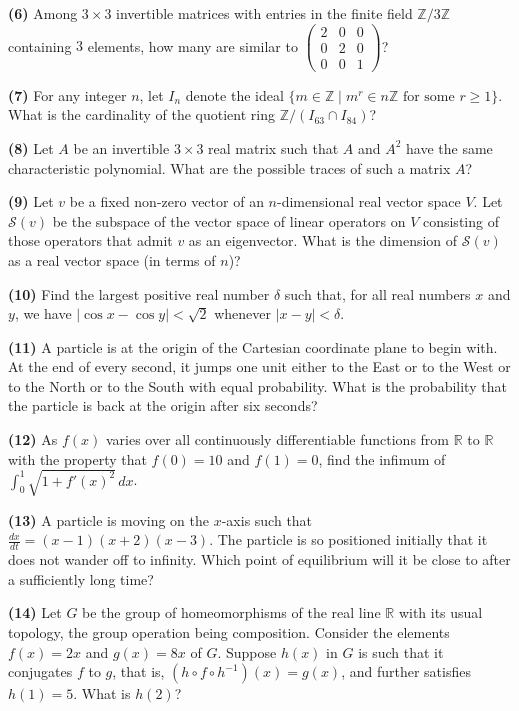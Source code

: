 \documentclass[11pt,a4paper]{article}
\newcommand{\Z}{\mathbb{Z}}
\newcommand{\R}{\mathbb{R}}
\newcommand{\qitem}[1]{\par\medskip\noindent\textbf{#1}\hspace{0.5em}}
\begin{document}
\qitem{(6)} Among $3 \times 3$ invertible matrices with entries in the finite field $\Z/3\Z$ containing $3$ elements, how many are similar to $\begin{pmatrix} 2 & 0 & 0 \\ 0 & 2 & 0 \\ 0 & 0 & 1 \end{pmatrix}$?

\qitem{(7)} For any integer $n$, let $I_n$ denote the ideal $\{m \in \Z \mid m^r \in n\Z \text{ for some } r \ge 1\}$. What is the cardinality of the quotient ring $\Z/(I_{63} \cap I_{84})$?

\qitem{(8)} Let $A$ be an invertible $3 \times 3$ real matrix such that $A$ and $A^2$ have the same characteristic polynomial. What are the possible traces of such a matrix $A$?

\qitem{(9)} Let $v$ be a fixed non-zero vector of an $n$-dimensional real vector space $V$. Let $\mathcal{S}(v)$ be the subspace of the vector space of linear operators on $V$ consisting of those operators that admit $v$ as an eigenvector. What is the dimension of $\mathcal{S}(v)$ as a real vector space (in terms of $n$)?

\qitem{(10)} Find the largest positive real number $\delta$ such that, for all real numbers $x$ and $y$, we have $|\cos x - \cos y| < \sqrt{2}$ whenever $|x - y| < \delta$.

\qitem{(11)} A particle is at the origin of the Cartesian coordinate plane to begin with. At the end of every second, it jumps one unit either to the East or to the West or to the North or to the South with equal probability. What is the probability that the particle is back at the origin after six seconds?

\qitem{(12)} As $f(x)$ varies over all continuously differentiable functions from $\R$ to $\R$ with the property that $f(0) = 10$ and $f(1) = 0$, find the infimum of $\int_0^1 \sqrt{1 + f'(x)^2}\,dx$.

\qitem{(13)} A particle is moving on the $x$-axis such that $\frac{dx}{dt} = (x - 1)(x + 2)(x - 3)$. The particle is so positioned initially that it does not wander off to infinity. Which point of equilibrium will it be close to after a sufficiently long time?

\qitem{(14)} Let $G$ be the group of homeomorphisms of the real line $\R$ with its usual topology, the group operation being composition. Consider the elements $f(x) = 2x$ and $g(x) = 8x$ of $G$. Suppose $h(x)$ in $G$ is such that it conjugates $f$ to $g$, that is, $(h \circ f \circ h^{-1})(x) = g(x)$, and further satisfies $h(1) = 5$. What is $h(2)$?
\end{document}
